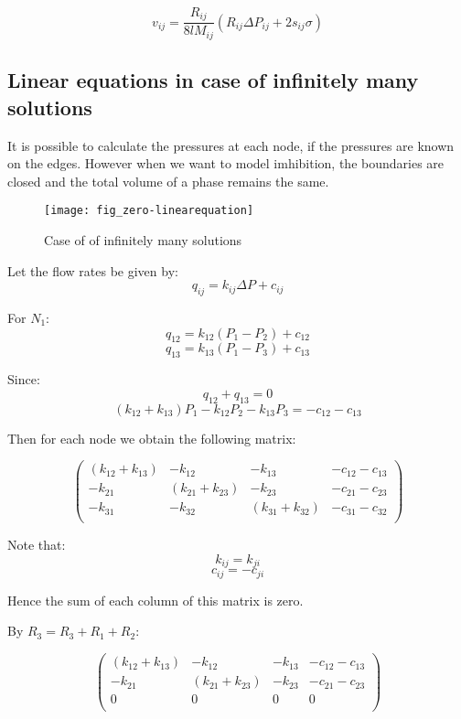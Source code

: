 	\begin{equation} \label{eq:velocity-in-tube}
		\boxed{v_{ij} = \frac{R_{ij}}{8lM_{ij}}(R_{ij}\Delta P_{ij} + 2s_{ij}\sigma)}
	\end{equation}

	
\subsection{Linear equations in case of infinitely many solutions}
	It is possible to calculate the pressures at each node, if the pressures are known on the edges. However when we want to model imhibition, the boundaries are closed and the total volume of a phase remains the same.
	
	\begin{figure}[H]
		\texttt{[image: fig\_zero-linearequation]}
		\caption{Case of of infinitely many solutions}
	\end{figure}
	
	Let the flow rates be given by:
	\begin{equation}
		q_{ij} = k_{ij} \Delta P + c_{ij}
	\end{equation}
	
	For $N_{1}$:
	\[ q_{12} = k_{12}(P_1 - P_2) + c_{12} \]
	\[ q_{13} = k_{13}(P_1 - P_3) + c_{13} \]
	
	Since:
	\[ q_{12} + q_{13} = 0 \]
	\[(k_{12} + k_{13})P_1 - k_{12}P_2 - k_{13}P_3 = -c_{12} - c_{13} \]
	
	Then for each node we obtain the following matrix:
	
	\[ 
	\begin{pmatrix}
		(k_{12} + k_{13}) & -k_{12} & -k_{13} & -c_{12} - c_{13} \\
		-k_{21} & (k_{21} + k_{23}) & -k_{23} & -c_{21} - c_{23} \\
		-k_{31} & -k_{32} & (k_{31} + k_{32}) & -c_{31} - c_{32} \\
	\end{pmatrix}
	\]
	
	Note that:
	\[ k_{ij} = k_{ji} \]
	\[ c_{ij} = -c_{ji} \]
	
	Hence the sum of each column of this matrix is zero.
	
	By $R_3 = R_3 + R_1 + R_2$:
	
	\[ 
	\begin{pmatrix}
		(k_{12} + k_{13}) & -k_{12} & -k_{13} & -c_{12} - c_{13} \\
		-k_{21} & (k_{21} + k_{23}) & -k_{23} & -c_{21} - c_{23} \\
		0 & 0 & 0 & 0 \\
	\end{pmatrix}
	\]
	
